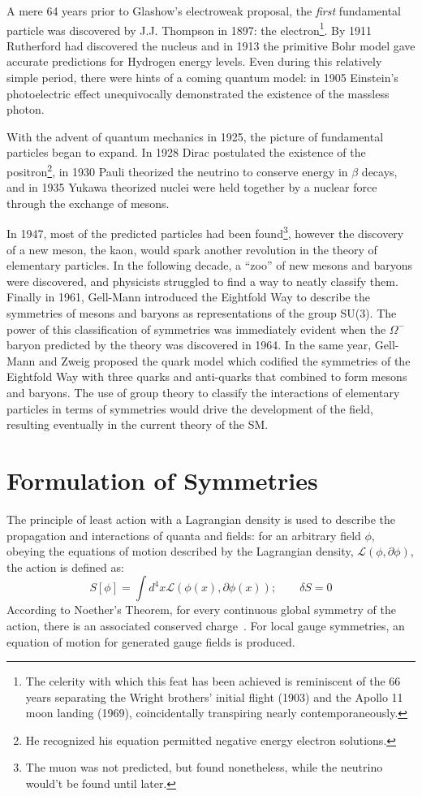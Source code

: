 A mere 64 years prior to Glashow's electroweak proposal, the {\em first} fundamental particle was discovered by J.J. Thompson in 1897: the electron\footnote{
	The celerity with which this feat has been achieved is reminiscent of the 66 years separating the Wright brothers' initial flight (1903) and the Apollo 11 moon landing (1969), coincidentally transpiring nearly contemporaneously.
}. By 1911 Rutherford had discovered the nucleus and in 1913 the primitive Bohr model gave accurate predictions for Hydrogen energy levels. Even during this relatively simple period, there were hints of a coming quantum model: in 1905 Einstein's photoelectric effect unequivocally demonstrated the existence of the massless photon. 

With the advent of quantum mechanics in 1925, the picture of fundamental particles began to expand. In 1928 Dirac postulated the existence of the positron\footnote{
	He recognized his equation permitted negative energy electron solutions.
}, in 1930 Pauli theorized the neutrino to conserve energy in $\beta$ decays, and in 1935 Yukawa theorized nuclei were held together by a nuclear force through the exchange of mesons.  

In 1947, most of the predicted particles had been found\footnote{
	The muon was not predicted, but found nonetheless, while the neutrino would't be found until later.
}, however the discovery of a new meson, the kaon, would spark another revolution in the theory of elementary particles. In the following decade, a ``zoo'' of new mesons and baryons were discovered, and physicists struggled to find a way to neatly classify them. Finally in 1961, Gell-Mann introduced the Eightfold Way to describe the symmetries of mesons and baryons as representations of the group SU(3). The power of this classification of symmetries was immediately evident when the $\Omega^-$ baryon predicted by the theory was discovered in 1964. In the same year, Gell-Mann and Zweig proposed the quark model which codified the symmetries of the Eightfold Way with three quarks and anti-quarks that combined to form mesons and baryons. The use of group theory to classify the interactions of elementary particles in terms of symmetries would drive the development of the field, resulting eventually in the current theory of the SM.

\fi

%
\section{Formulation of Symmetries}
The principle of least action with a Lagrangian density is used to describe the propagation and interactions of quanta and fields: for an arbitrary field $\phi$, obeying the equations of motion described by the Lagrangian density, $\mathcal{L}(\phi,\partial\phi)$, the action is defined as:
 $$S[\phi] = \int d^4x \mathcal{L}(\phi(x),\partial\phi(x)); \quad\quad \delta S = 0$$ 
 According to Noether's Theorem, for every continuous global symmetry of the action, there is an associated conserved charge~\cite{noether}. For local gauge symmetries, an equation of motion for generated gauge fields is produced.

